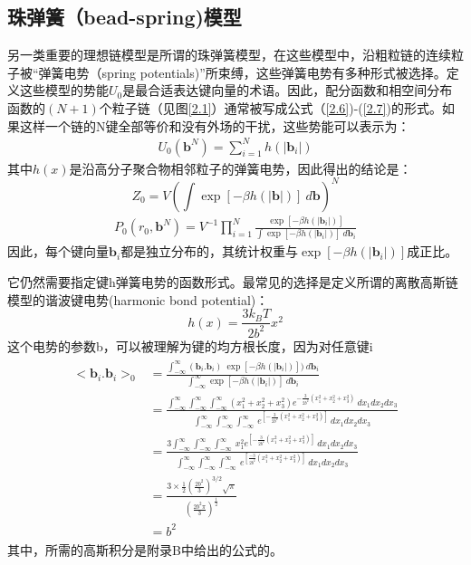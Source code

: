 \subsection{珠弹簧（bead-spring)模型}
另一类重要的理想链模型是所谓的珠弹簧模型，在这些模型中，沿粗粒链的连续粒子被“弹簧电势（spring potentials)”所束缚，这些弹簧电势有多种形式被选择。定义这些模型的势能$U_{0}$是最合适表达键向量的术语。因此，配分函数和相空间分布函数的$(N+1)$个粒子链（见图\ref{2.1}）通常被写成公式（\ref{2.6})-(\ref{2.7})的形式。如果这样一个链的N键全部等价和没有外场的干扰，这些势能可以表示为：
\begin{equation}\label{2.26}
\begin{split}
U_{0}(\mathbf{b}^{N})= \sum_{i=1}^{N}h(|\mathbf{b}_{i}|)
\end{split}
\end{equation}
其中$h(x)$是沿高分子聚合物相邻粒子的弹簧电势，因此得出的结论是：
\begin{equation}\label{2.27}
Z_{0}=V(\int \exp[-\beta h(|\mathbf{b}|)]~d\mathbf{b})^N 
\end{equation}
\begin{equation}\label{2.28}
\begin{split}		
P_{0} (r_{0},\mathbf{b}^N) =V^{-1} \prod_{i=1}^{N} \frac{\exp[-\beta h(|\mathbf{b}_{i}|)]}{\int \exp[-\beta h(|\mathbf{b}_{i}|)]~d \mathbf{b}_{i}}
\end{split}
\end{equation}
因此，每个键向量$\mathbf{b}_{i}$都是独立分布的，其统计权重与$\exp[-\beta h(|\mathbf{b}_{i}|)]$成正比。 

它仍然需要指定键h弹簧电势的函数形式。最常见的选择是定义所谓的离散高斯链模型的谐波键电势(harmonic bond potential)： 
\begin{equation}\label{2.29}
h(x)=\frac{3k_{B}T}{2b^2} x^2  
\end{equation}
这个电势的参数b，可以被理解为键的均方根长度，因为对任意键i 
\begin{align}\label{2.30}
\begin{split}
<\mathbf{b}_{i}.\mathbf{b}_{i}>_{0}&= \frac{\int_{-\infty}^{\infty} (\mathbf{b}_{i}.\mathbf{b}_{i})~\exp[-\beta h(|\mathbf{b}_{i}|)])~d\mathbf{b}_{i}}{\int_{-\infty}^{\infty} \exp[-\beta h(|\mathbf{b}_{i}|)]~d\mathbf{b}_{i}}\\ &=\frac{\int_{-\infty}^{\infty}\int_{-\infty}^{\infty}\int_{-\infty}^{\infty}(x_1^2+x_2^2+x_3^2)e^{-\frac{3}{2b^2}(x_1^2+x_2^2+x_3^2)}~dx_1dx_2dx_3}{\int_{-\infty}^{\infty}\int_{-\infty}^{\infty}\int_{-\infty}^{\infty}~e^{[-\frac{3}{2b^2}(x_1^2+x_2^2+x_3^2)]}~dx_1dx_2dx_3}\\ &=\frac{3\int_{-\infty}^{\infty}\int_{-\infty}^{\infty}\int_{-\infty}^{\infty}~x_1^2e^{[-\frac{3}{2b^2}(x_1^2+x_2^2+x_3^2)]}~dx_1dx_2dx_3}{\int_{-\infty}^{\infty}\int_{-\infty}^{\infty}\int_{-\infty}^{\infty}~e^{[\frac{-3}{2b^2}(x_1^2+x_2^2+x_3^2)]}~dx_1dx_2dx_3}\\ &=\frac{3 \times\frac{1}{2} (\frac{2b^2}{3})^{3/2}\sqrt{\pi}}{(\frac{2b^2\pi}{3})^{\frac{1}{2}}}\\ &=b^2
\end{split}
\end{align}
其中，所需的高斯积分是附录B中给出的公式的。

